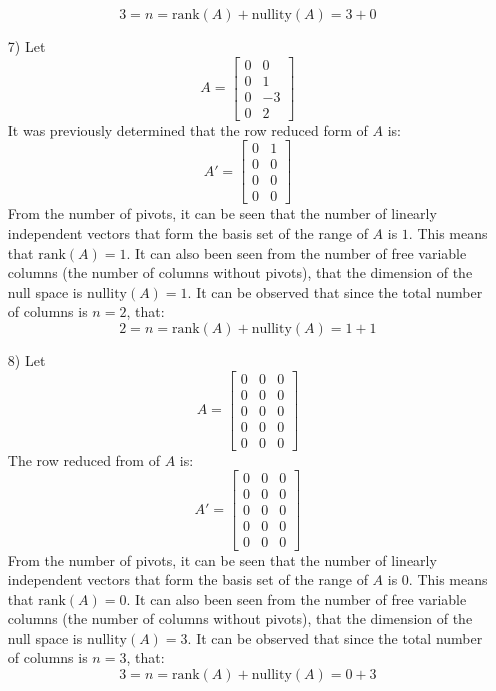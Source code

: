 \documentclass{article}
\begin{document}
\begin{itemize}
\[3 = n = \text{rank}(A) + \text{nullity}(A) = 3 + 0\] 
\item[7)] Let \[A = \begin{bmatrix}
0 &  0 \\
0 &  1 \\
0 & -3 \\ 
0 &  2
\end{bmatrix}\]
It was previously determined that the row reduced form of \(A\) is: 
\[A' = \begin{bmatrix}
0 & 1 \\
0 & 0 \\
0 & 0 \\ 
0 & 0
\end{bmatrix}\] 
From the number of pivots, it can be seen that the number of linearly independent vectors that form the basis set of the range of \(A\) is \(1\). This means that \(\text{rank}(A) = 1\). It can also been seen from the number of free variable columns (the number of columns without pivots), that the dimension of the null space is \(\text{nullity}(A) = 1\). It can be observed that since the total number of columns is \(n = 2\), that:
\[2 = n = \text{rank}(A) + \text{nullity}(A) = 1 + 1\] 
\item[8)] Let \[A = \begin{bmatrix}
0 & 0 & 0 \\ 
0 & 0 & 0 \\ 
0 & 0 & 0 \\ 
0 & 0 & 0 \\ 
0 & 0 & 0 
\end{bmatrix}\]
The row reduced from of \(A\) is: 
\[A' = \begin{bmatrix}
0 & 0 & 0 \\ 
0 & 0 & 0 \\ 
0 & 0 & 0 \\ 
0 & 0 & 0 \\ 
0 & 0 & 0 
\end{bmatrix}\]
From the number of pivots, it can be seen that the number of linearly independent vectors that form the basis set of the range of \(A\) is \(0\). This means that \(\text{rank}(A) = 0\). It can also been seen from the number of free variable columns (the number of columns without pivots), that the dimension of the null space is \(\text{nullity}(A) = 3\). It can be observed that since the total number of columns is \(n = 3\), that:
\[3 = n = \text{rank}(A) + \text{nullity}(A) = 0 + 3\] 
\end{itemize}
\end{document}
